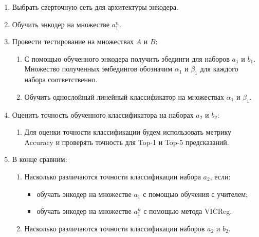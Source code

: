 \begin{enumerate}

    \item Выбрать сверточную сеть для архитектуры энкодера.
    \item Обучить энкодер на множестве $a_1^n$.
    \item Провести тестирование на множествах $A$ и $B$:
        \begin{enumerate}
            \item С помощью обученного энкодера получить эбединги для наборов $a_1$ и $b_1$. Множество полученных эмбедингов обозначим $\alpha_1$ и $\beta_1$ для каждого набора соответственно.
            \item Обучить однослойный линейный классификатор на множествах $\alpha_1$ и $\beta_1$.
        \end{enumerate}    
    \item Оценить точность обученного классификатора на наборах $a_2$ и $b_2$:
        \begin{enumerate}
            \item Для оценки точности классификации будем использовать метрику Accuracy и проверять точность для Top-1 и Top-5 предсказаний.
        \end{enumerate}    
    \item В конце сравним:
        \begin{enumerate}
            \item Насколько различаются точности классификации набора $a_2$, если:
                \begin{itemize}
                    \item обучать энкодер на множестве $a_1$ с помощью обучения с учителем;
                    \item обучать энкодер на множестве $a_1^n$  с помощью метода VICReg.
                \end{itemize}
            \item Насколько различаются точности классификации наборов $a_2$ и $b_2$.
        \end{enumerate}
        
\end{enumerate}